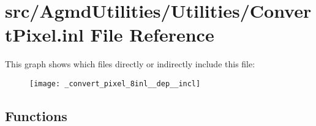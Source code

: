 \hypertarget{_convert_pixel_8inl}{\section{src/\+Agmd\+Utilities/\+Utilities/\+Convert\+Pixel.inl File Reference}
\label{_convert_pixel_8inl}
}
This graph shows which files directly or indirectly include this file\+:\nopagebreak
\begin{figure}[H]
\begin{center}
\leavevmode
\texttt{[image: \_convert\_pixel\_8inl\_\_dep\_\_incl]}
\end{center}
\end{figure}
\subsection*{Functions}
